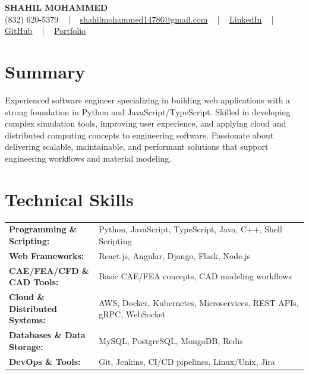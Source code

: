 \documentclass[letterpaper,11pt]{article}
\begin{document}
\begin{center}
    {\fontsize{14pt}{12pt}\selectfont \textbf{\MakeUppercase{Shahil Mohammed}}}\\ \vspace{2pt}
    \fontsize{10pt}{12pt}\selectfont (832) 620-5379 ~ | ~ \href{mailto:shahilmohammed14786@gmail.com}{shahilmohammed14786@gmail.com} ~ | ~  
    \href{https://www.linkedin.com/in/shahil-mohammed-9652931a1/}{\color{blue}\underline{LinkedIn}}  ~ | ~ 
    \href{https://github.com/freakbeast14}{\color{blue}\underline{GitHub}} ~ | ~ 
    \href{https://shahil-mohammed.netlify.app/}{\color{blue}\underline{Portfolio}}
    \vspace{-8pt}
\end{center}

\section{Summary}
\fontsize{9pt}{10pt}\selectfont
Experienced software engineer specializing in building web applications with a strong foundation in Python and JavaScript/TypeScript. Skilled in developing complex simulation tools, improving user experience, and applying cloud and distributed computing concepts to engineering software. Passionate about delivering scalable, maintainable, and performant solutions that support engineering workflows and material modeling.
 \vspace{-5pt}
 
\section{Technical Skills}
        \vspace{-14pt}
        \begin{table}[h]
            \fontsize{9pt}{10pt}\selectfont
            \begin{tabular}{p{0.3\linewidth} p{0.7\linewidth}}
                \textbf{Programming \& Scripting:} & Python, JavaScript, TypeScript, Java, C++, Shell Scripting \\
                \textbf{Web Frameworks:} & React.js, Angular, Django, Flask, Node.js \\
                \textbf{CAE/FEA/CFD \& CAD Tools:} & Basic CAE/FEA concepts, CAD modeling workflows \\
                \textbf{Cloud \& Distributed Systems:} & AWS, Docker, Kubernetes, Microservices, REST APIs, gRPC, WebSocket \\
                \textbf{Databases \& Data Storage:} & MySQL, PostgreSQL, MongoDB, Redis \\
                \textbf{DevOps \& Tools:} & Git, Jenkins, CI/CD pipelines, Linux/Unix, Jira \\
            \end{tabular}
        \end{table}
 \vspace{-15pt}
 
\end{document}
